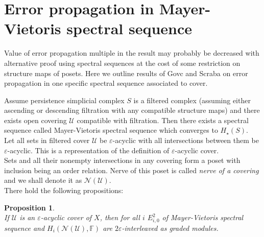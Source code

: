 \documentclass[a4paper, 12pt]{article}
\newtheorem{proposition}{Proposition}
\theoremstyle{definition}
\theoremstyle{remark}
\newenvironment{pf}{\noindent\textbf{Proof.}}{\qed}
\newcommand{\define}[1]{{\textit{#1}}}
\begin{document}
%
%
%

\section{Error propagation in Mayer-Vietoris spectral sequence}

Value of error propagation multiple in the result may probably be decreased with alternative proof using spectral sequences at the cost of some restriction on structure maps of posets. Here we outline results of Govc and Scraba on error propagation in one specific spectral sequence associated to cover.

Assume persistence simplicial complex $S$ is a filtered complex (assuming either ascending or descending filtration with any compatible structure maps) and there exists open covering $\mathcal{U}$ compatible with filtration. Then there exists a spectral sequence called Mayer-Vietoris spectral sequence which converges to $H_{\star}(S)$. {\cite[Theorem 2.30]{GS16}}\\

Let all sets in filtered cover $\mathcal{U}$ be $\varepsilon$-acyclic with all intersections between them be $\varepsilon$-acyclic. This is a representation of the definition of $\varepsilon$-acyclic cover. {\cite[Definition 3.2]{GS16}}\\

Sets and all their nonempty intersections in any covering form a poset with inclusion being an order relation. Nerve of this poset is called \define{nerve of a covering} and we shall denote it as $\mathcal{N}(\mathcal{U})$.\\

There hold the following propositions:

\begin{proposition} {\cite[Corollary 5.2]{GS16}}\\
  If $\mathcal{U}$ is an $\varepsilon$-acyclic cover of $X$, then for all $i$ $E^2_{i,0}$ of Mayer-Vietoris spectral sequence and $H_{i}(\mathcal{N}(\mathcal{U}),\mathbb{F})$ are $2\varepsilon$-interleaved as graded modules.
\end{proposition}
\end{document}

